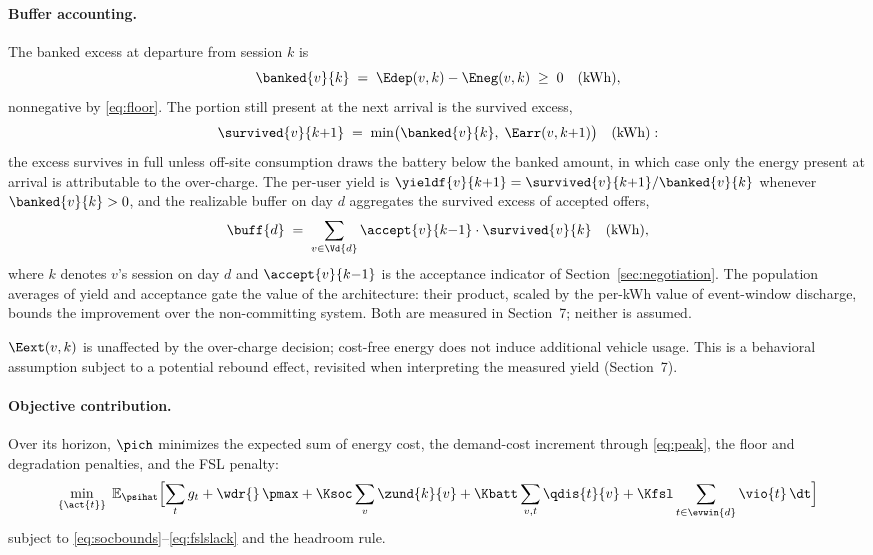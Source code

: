 \paragraph{Buffer accounting.} The banked excess at departure from
session $k$ is
\begin{equation}\label{eq:banked}
\banked{v}{k} \;=\; \Edep(v,k) - \Eneg(v,k) \;\ge\; 0 \quad \text{(kWh)},
\end{equation}
nonnegative by \eqref{eq:floor}. The portion still present at the next
arrival is the survived excess,
\begin{equation}\label{eq:survived}
\survived{v}{k{+}1} \;=\; \min\bigl(\banked{v}{k},\;
\Earr(v,k{+}1)\bigr) \quad \text{(kWh)}:
\end{equation}
the excess survives in full unless off-site consumption draws the
battery below the banked amount, in which case only the energy present
at arrival is attributable to the over-charge. The per-user yield is
$\yieldf{v}{k{+}1} = \survived{v}{k{+}1}/\banked{v}{k}$ whenever
$\banked{v}{k} > 0$, and the realizable buffer on day $d$ aggregates the
survived excess of accepted offers,
\begin{equation}\label{eq:buffer}
\buff{d} \;=\; \sum_{v \in \Vd{d}} \accept{v}{k{-}1}\cdot
\survived{v}{k} \quad \text{(kWh)},
\end{equation}
where $k$ denotes $v$'s session on day $d$ and $\accept{v}{k{-}1}$ is
the acceptance indicator of Section~\ref{sec:negotiation}. The
population averages of yield and acceptance gate the value of the
architecture: their product, scaled by the per-kWh value of
event-window discharge, bounds the improvement over the non-committing
system. Both are measured in Section~7; neither is assumed.

\begin{assumption}\label{as:exo}
$\Eext(v,k)$ is unaffected by the over-charge decision; cost-free energy
does not induce additional vehicle usage. This is a behavioral
assumption subject to a potential rebound effect, revisited when
interpreting the measured yield (Section~7).
\end{assumption}

\paragraph{Objective contribution.} Over its horizon, $\pich$ minimizes
the expected sum of energy cost, the demand-cost increment through
\eqref{eq:peak}, the floor and degradation penalties, and the FSL
penalty:
\begin{equation}\label{eq:chobj}
\min_{\{\act{t}\}} \;
\mathbb{E}_{\psihat}\Bigl[\sum_{t} g_t + \wdr{}\,\pmax
+ \Ksoc \sum_{v} \zund{k}{v}
+ \Kbatt \sum_{v,t} \qdis{t}{v}
+ \Kfsl \sum_{t \in \evwin{d}} \vio{t}\,\dt \Bigr]
\end{equation}
subject to \eqref{eq:socbounds}--\eqref{eq:fslslack} and the headroom
rule.

